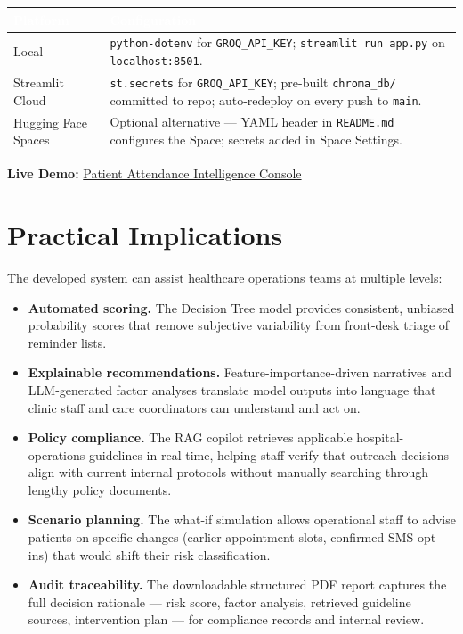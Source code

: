 \documentclass[11pt,a4paper]{article}
\newcommand{\hdrrow}[1]{\textcolor{white}{\textbf{#1}}}
\newcommand{\hdrline}{\rowcolor{navy}}
\begin{document}
\begin{tabularx}{\textwidth}{|>{\hsize=0.3\hsize}X|X|}
\hline
\hdrline \hdrrow{Platform} & \hdrrow{Configuration} \\ \hline
Local             & \texttt{python-dotenv} for \texttt{GROQ\_API\_KEY}; \texttt{streamlit run app.py} on \texttt{localhost:8501}. \\ \hline
Streamlit Cloud   & \texttt{st.secrets} for \texttt{GROQ\_API\_KEY}; pre-built \texttt{chroma\_db/} committed to repo; auto-redeploy on every push to \texttt{main}. \\ \hline
Hugging Face Spaces & Optional alternative --- YAML header in \texttt{README.md} configures the Space; secrets added in Space Settings. \\ \hline
\end{tabularx}

\vspace{6pt}
\textbf{Live Demo:}
\href{https://genaicapstone4-anot5dcxcx9vhuxzsifnzb.streamlit.app/}{Patient Attendance Intelligence Console}

\section{Practical Implications}

The developed system can assist healthcare operations teams at multiple
levels:

\begin{itemize}[leftmargin=1.2em]
\item \textbf{Automated scoring.} The Decision Tree model provides
      consistent, unbiased probability scores that remove subjective
      variability from front-desk triage of reminder lists.
\item \textbf{Explainable recommendations.} Feature-importance-driven
      narratives and LLM-generated factor analyses translate model
      outputs into language that clinic staff and care coordinators can
      understand and act on.
\item \textbf{Policy compliance.} The RAG copilot retrieves applicable
      hospital-operations guidelines in real time, helping staff verify
      that outreach decisions align with current internal protocols
      without manually searching through lengthy policy documents.
\item \textbf{Scenario planning.} The what-if simulation allows
      operational staff to advise patients on specific changes (earlier
      appointment slots, confirmed SMS opt-ins) that would shift their
      risk classification.
\item \textbf{Audit traceability.} The downloadable structured PDF
      report captures the full decision rationale --- risk score,
      factor analysis, retrieved guideline sources, intervention plan
      --- for compliance records and internal review.
\end{itemize}
\end{document}
